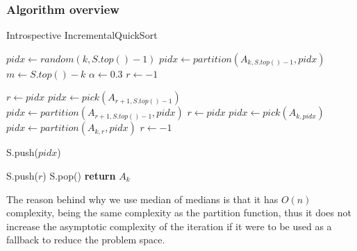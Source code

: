 \subsubsection{Algorithm overview}
\begin{algorithm}
  \begin{algorithmic}[1]
    \caption{Introspective IncrementalQuickSort}\label{ALG:IIQS}
      \State $pidx \gets random(k,S.top()-1)$
      \State $pidx \gets partition(A_{k,S.top()-1}, pidx)$
      \State $m \gets S.top() - k$
      \State $\alpha \gets 0.3$
      \State $r \gets -1$

        \State $r \gets pidx$
        \State $pidx \gets pick(A_{r+1,S.top()-1})$
        \State $pidx \gets partition(A_{r+1,S.top()-1},pidx)$
        \State $r \gets pidx$
        \State $pidx \gets pick(A_{k,pidx})$
        \State $pidx \gets partition(A_{k,r}, pidx)$
        \State $r \gets -1$
      \EndIf

      \State S.push($pidx$)

        \State S.push($r$)
      \EndIf  
    \EndWhile
    \State S.pop()
    \State \textbf{return} $A_{k}$\label{IIQS_main_cycle}
    \EndProcedure
  \end{algorithmic}
\end{algorithm}

The reason behind why we use median of medians is that it has $O(n)$ complexity, being the same complexity as the partition function, thus it does not increase the asymptotic complexity of the iteration if it were to be used as a fallback to reduce the problem space.\\

\FloatBarrier